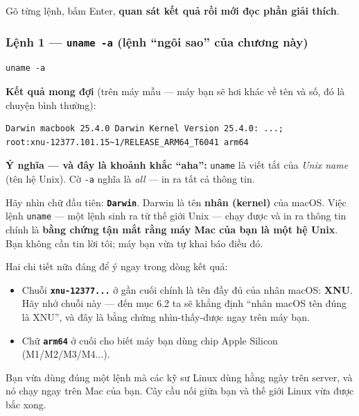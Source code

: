 \documentclass[12pt,a4paper]{article}
\begin{document}
Gõ từng lệnh, bấm Enter, \textbf{quan sát kết quả rồi mới đọc phần giải thích}.

\subsubsection{Lệnh 1 — \texttt{uname -a} (lệnh ``ngôi sao'' của chương này)}

\begin{labbox}[Lệnh]
\begin{verbatim}
uname -a
\end{verbatim}
\end{labbox}

\textbf{Kết quả mong đợi} (trên máy mẫu — máy bạn sẽ hơi khác về tên và số, đó là chuyện bình thường):

\begin{termbox}
\begin{verbatim}
Darwin macbook 25.4.0 Darwin Kernel Version 25.4.0: ...;
root:xnu-12377.101.15~1/RELEASE_ARM64_T6041 arm64
\end{verbatim}
\end{termbox}

\textbf{Ý nghĩa — và đây là khoảnh khắc ``aha'':} \texttt{uname} là viết tắt của \textit{Unix name} (tên hệ Unix). Cờ \texttt{-a} nghĩa là \textit{all} — in ra tất cả thông tin.

Hãy nhìn chữ đầu tiên: \textbf{\texttt{Darwin}}. Darwin là tên \textbf{nhân (kernel)} của macOS. Việc lệnh \texttt{uname} — một lệnh sinh ra từ thế giới Unix — chạy được và in ra thông tin chính là \textbf{bằng chứng tận mắt rằng máy Mac của bạn là một hệ Unix}. Bạn không cần tin lời tôi; máy bạn vừa tự khai báo điều đó.

Hai chi tiết nữa đáng để ý ngay trong dòng kết quả:
\begin{itemize}[leftmargin=*]
  \item Chuỗi \textbf{\texttt{xnu-12377...}} ở gần cuối chính là tên đầy đủ của nhân macOS: \textbf{XNU}. Hãy nhớ chuỗi này — đến mục 6.2 ta sẽ khẳng định ``nhân macOS tên đúng là XNU'', và đây là bằng chứng nhìn-thấy-được ngay trên máy bạn.
  \item Chữ \textbf{\texttt{arm64}} ở cuối cho biết máy bạn dùng chip Apple Silicon (M1/M2/M3/M4...).
\end{itemize}

\begin{tipbox}
Bạn vừa dùng đúng một lệnh mà các kỹ sư Linux dùng hằng ngày trên server, và nó chạy ngay trên Mac của bạn. Cây cầu nối giữa bạn và thế giới Linux vừa được bắc xong.
\end{tipbox}
\end{document}
